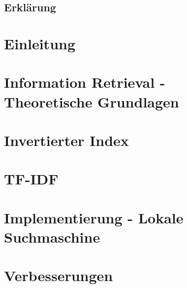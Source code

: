 \documentclass[12pt, a4paper, toc=listof, toc=bibliography]{scrreprt}
\newcommand\blankpage{%
	\null
	\thispagestyle{empty}%
	\addtocounter{page}{-1}%
	\newpage}
\begin{document}
	
	\thispagestyle{empty}
	\section*{Erklärung}
	
	\thispagestyle{empty}
	\newpage
	\begin{abstract}
		
	\end{abstract}
	\afterpage{\blankpage}
	\tableofcontents
	\thispagestyle{empty}
	\listoffigures
	\thispagestyle{plain}
	\label{abkürzung}
	
	\thispagestyle{plain}
	\pagestyle{fancy}
	\begin{spacing}{1.5}	
		\chapter{Einleitung}
		\label{einleitung}
		
		\chapter{Information Retrieval - Theoretische Grundlagen}
		\label{grundlagen}
		
		\chapter{Invertierter Index}
		\label{invertindex}
		
		\chapter{TF-IDF}
		\label{tfidf}
		
		\chapter{Implementierung - Lokale Suchmaschine}
		\label{impl}
		
		\chapter{Verbesserungen}
		\label{improvements}
		
	\end{spacing}
\end{document}
